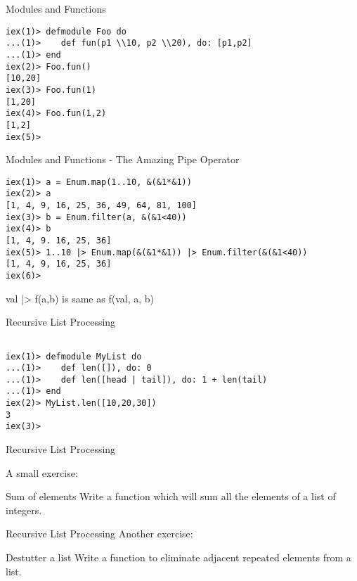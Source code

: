 \documentclass{beamer}
\begin{document}
\begin{frame}[fragile]{Modules and Functions}

\begin{verbatim}
iex(1)> defmodule Foo do
...(1)>    def fun(p1 \\10, p2 \\20), do: [p1,p2]
...(1)> end
iex(2)> Foo.fun()
[10,20]
iex(3)> Foo.fun(1)
[1,20]
iex(4)> Foo.fun(1,2)
[1,2]
iex(5)>
\end{verbatim}
\end{frame}
\begin{frame}[fragile]{Modules and Functions - The Amazing Pipe Operator}

\begin{verbatim}
iex(1)> a = Enum.map(1..10, &(&1*&1))
iex(2)> a
[1, 4, 9, 16, 25, 36, 49, 64, 81, 100]
iex(3)> b = Enum.filter(a, &(&1<40))
iex(4)> b
[1, 4, 9. 16, 25, 36]
iex(5)> 1..10 |> Enum.map(&(&1*&1)) |> Enum.filter(&(&1<40))
[1, 4, 9, 16, 25, 36]
iex(6)> 
\end{verbatim}

val |> f(a,b) is same as f(val, a, b)

\end{frame}
\begin{frame}[fragile]{Recursive List Processing}

\begin{verbatim}

iex(1)> defmodule MyList do
...(1)>    def len([]), do: 0
...(1)>    def len([head | tail]), do: 1 + len(tail)
...(1)> end
iex(2)> MyList.len([10,20,30])
3
iex(3)>

\end{verbatim}

\end{frame}

\begin{frame}{Recursive List Processing}

A small exercise:

\begin{block}{Sum of elements}
Write a function which will sum all the elements of a list of integers.
\end{block}

\end{frame}

\begin{frame}{Recursive List Processing}
Another exercise:

\begin{block}{Destutter a list}
Write a function to eliminate adjacent repeated elements from a list.
\end{block}

\end{frame}
\end{document}
